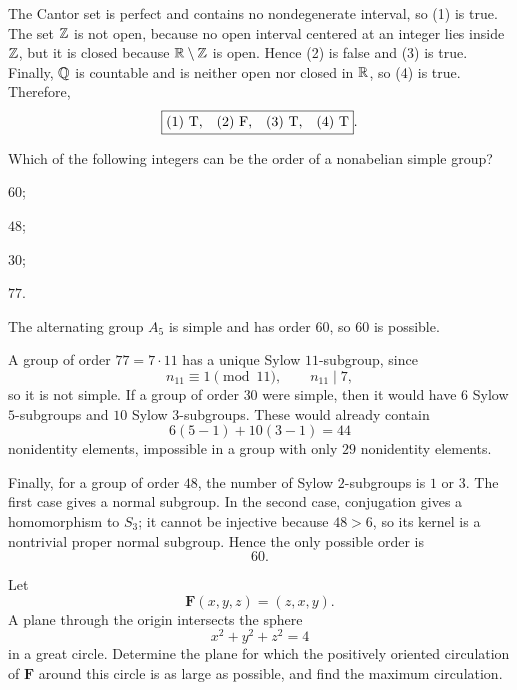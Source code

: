     \begin{solution}
        The Cantor set is perfect and contains no nondegenerate interval, so
        (1) is true. The set $\mathbb{Z}$ is not open, because no open interval centered
        at an integer lies inside $\mathbb{Z}$, but it is closed because
        $\mathbb{R}\setminus\mathbb{Z}$ is open. Hence (2) is false and (3) is true. Finally,
        $\mathbb{Q}$ is countable and is neither open nor closed in $\mathbb{R}$, so (4) is
        true. Therefore,
        \[
            \boxed{\text{(1) T,\quad (2) F,\quad (3) T,\quad (4) T}}.
        \]
    \end{solution}

    \begin{expectedproblem}
        Which of the following integers can be the order of a nonabelian simple
        group?
        \begin{problemchoices}
            \item $60$;
            \item $48$;
            \item $30$;
            \item $77$.
        \end{problemchoices}
    \end{expectedproblem}

    \begin{solution}
        The alternating group $A_5$ is simple and has order $60$, so $60$ is
        possible.

        A group of order $77=7\cdot11$ has a unique Sylow $11$-subgroup, since
        \[
            n_{11}\equiv1\pmod{11},
            \qquad
            n_{11}\mid7,
        \]
        so it is not simple. If a group of order $30$ were simple, then it would
        have $6$ Sylow $5$-subgroups and $10$ Sylow $3$-subgroups. These would
        already contain
        \[
            6(5-1)+10(3-1)=44
        \]
        nonidentity elements, impossible in a group with only $29$
        nonidentity elements.

        Finally, for a group of order $48$, the number of Sylow $2$-subgroups
        is $1$ or $3$. The first case gives a normal subgroup. In the second
        case, conjugation gives a homomorphism to $S_3$; it cannot be injective
        because $48>6$, so its kernel is a nontrivial proper normal subgroup.
        Hence the only possible order is
        \[
            \boxed{60}.
        \]
    \end{solution}

    \begin{expectedproblem}
        Let
        \[
            \mathbf{F}(x,y,z)=(z,x,y).
        \]
        A plane through the origin intersects the sphere
        \[
            x^2+y^2+z^2=4
        \]
        in a great circle. Determine the plane for which the positively
        oriented circulation of $\mathbf{F}$ around this circle is as large as
        possible, and find the maximum circulation.
    \end{expectedproblem}

